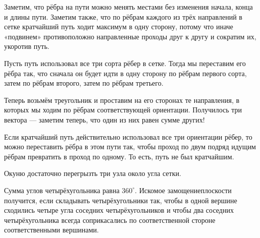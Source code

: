 \begin{itemize}

\itA Заметим, что рёбра на пути можно менять местами без изменения начала, конца и длины пути. Заметим также, что по рёбрам каждого из трёх направлений в сетке кратчайший путь ходит максимум в одну сторону, потому что иначе «подвинем» противоположно направленные проходы друг к другу и сократим их, укоротив путь.

Пусть путь использовал все три сорта рёбер в сетке. Тогда мы переставим его рёбра так, что сначала он будет идти в одну сторону по рёбрам первого сорта, затем по рёбрам второго, затем по рёбрам третьего.

Теперь возьмём треугольник и проставим на его сторонах те направления, в которых мы ходим по рёбрам соответствующей ориентации. Получилось три вектора — заметим теперь, что один из них равен сумме других!

Если кратчайший путь действительно использовал все три ориентации рёбер, то можно переставить рёбра в этом пути так, чтобы проход по двум подряд идущим рёбрам превратить в проход по одному. То есть, путь не был кратчайшим.

\itB Окуню достаточно перегрызть три узла около угла сетки.

\itC Сумма углов четырёхугольника равна $360^\circ$. Искомое замощение\linebreak плоскости получится, если складывать четырёхугольники так, чтобы в одной вершине сходились четыре угла соседних четырёхугольников и чтобы два соседних четырёхугольника всегда соприкасались по соответственной стороне соответственными вершинами.
\end{itemize}